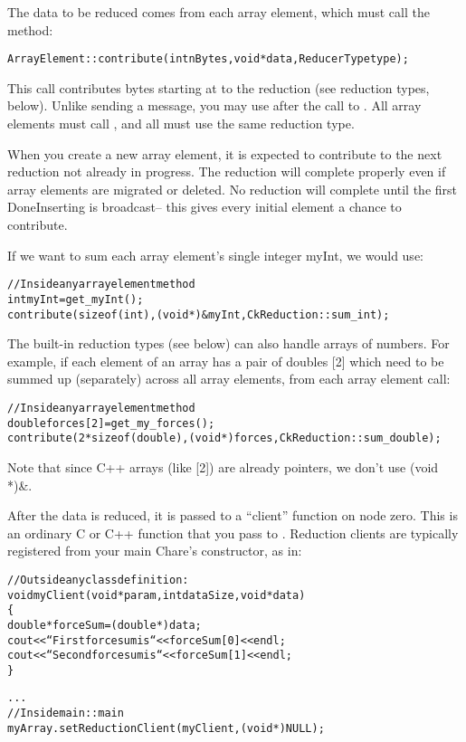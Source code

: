 The data to be reduced comes from each array element, 
which must call the  method:

\begin{alltt}
ArrayElement::contribute(int nBytes,void *data,ReducerType type);
\end{alltt}

This call contributes  bytes starting at  to the
reduction  (see reduction types, below).  Unlike sending a
message, you may use  after the call to .  All
array elements must call , and all must use the same
reduction type.  

When you create a new array element, it is expected
to contribute to the next reduction not already in progress.  The
reduction will complete properly even if array elements are migrated
or deleted. No reduction will complete until the first DoneInserting
is broadcast-- this gives every initial element a chance to contribute.

If we want to sum each array element's single integer myInt, we would use:

\begin{alltt}
    //Inside any array element method
    int myInt=get_myInt();
    contribute(sizeof(int),(void *)\&myInt,CkReduction::sum_int);
\end{alltt}

The built-in reduction types (see below) can also handle arrays of
numbers.  For example, if each element of an array has a pair of
doubles [2] which need to be summed up (separately) across
all array elements, from each array element call:

\begin{alltt}
    //Inside any array element method
    double forces[2]=get_my_forces();
    contribute(2*sizeof(double),(void *)forces,CkReduction::sum_double);
\end{alltt}

Note that since C++ arrays (like [2]) are already pointers, we 
don't use (void *)\&.


After the data is reduced, it is passed to a ``client'' function on
node zero.  This is an ordinary C or C++ function that you pass to
.  Reduction clients are
typically registered from your main Chare's constructor, as in:

\begin{alltt}
//Outside any class definition:
void myClient(void *param,int dataSize,void *data)
\{
  double *forceSum=(double *)data;
  cout<<``First force sum is ``<<forceSum[0]<<endl;
  cout<<``Second force sum is ``<<forceSum[1]<<endl;
\}

...
    //Inside main::main
    myArray.setReductionClient(myClient,(void *)NULL);
\end{alltt}

